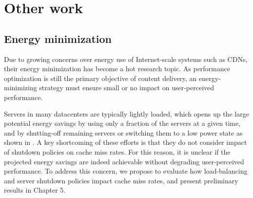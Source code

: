 
\section{Other work}

\subsection{Energy minimization}
\label{sec:cdnenergy}

Due to growing concerns over energy use of Internet-scale systems such as CDNs, their energy minimization has become a hot research topic. As performance optimization is still the primary objective of content delivery, an energy-minimizing strategy must ensure small or no impact on user-perceived performance. 


Servers in many datacenters are typically lightly loaded, which opens up the large potential energy savings by using only a fraction of the servers at a given time, and by shutting-off remaining servers or switching them to a low power state as shown in \cite{mathew12,JainEnergy,lin12,lu13}. A key shortcoming of these efforts is that they do not consider impact of shutdown policies on cache miss rates. For this reason, it is unclear if the projected energy savings are indeed achievable without degrading user-perceived performance.  To address this concern, we propose to evaluate how load-balancing and server shutdown policies impact cache miss rates, and present preliminary results in Chapter 5. 


